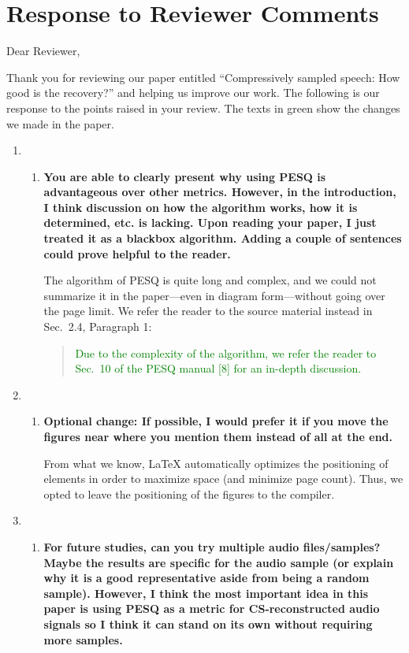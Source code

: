 \documentclass[a4paper,12pt]{article}
\begin{document}
\section*{Response to Reviewer Comments}

Dear Reviewer,

Thank you for reviewing our paper entitled ``Compressively sampled speech: How good is the recovery?'' and helping us improve our work. The following is our response to the points raised in your review. The texts in green show the changes we made in the paper.

\begin{enumerate}
	\item
		\begin{enumerate}
			\item \textbf{You are able to clearly present why using PESQ is advantageous over other metrics. However, in the introduction, I think discussion on how the algorithm works, how it is determined, etc. is lacking. Upon reading your paper, I just treated it as a blackbox algorithm. Adding a couple of sentences could prove helpful to the reader.}
			
			The algorithm of PESQ is quite long and complex, and we could not summarize it in the paper---even in diagram form---without going over the page limit. We refer the reader to the source material instead in Sec.~2.4, Paragraph 1:
			
			\begin{quotation}
				\textcolor{Green}{Due to the complexity of the algorithm, we refer the reader to Sec.~10 of the PESQ manual [8] for an in-depth discussion.}
			\end{quotation}
		\end{enumerate}
	
	\item
		\begin{enumerate}
			\item \textbf{Optional change: If possible, I would prefer it if you move the figures near where you mention them instead of all at the end.}
			
			From what we know, LaTeX automatically optimizes the positioning of elements in order to maximize space (and minimize page count). Thus, we opted to leave the positioning of the figures to the compiler.
		\end{enumerate}
	
	\item
		\begin{enumerate}
			\item \textbf{For future studies, can you try multiple audio files/samples? Maybe the results are specific for the audio sample (or explain why it is a good representative aside from being a random sample). However, I think the most important idea in this paper is using PESQ as a metric for CS-reconstructed audio signals so I think it can stand on its own without requiring more samples.}
			

\end{enumerate}
\end{enumerate}
\end{document}
